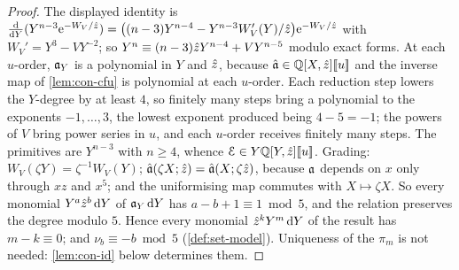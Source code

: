 \begin{proof}
The displayed identity is $\frac{\mathrm{d}}{\mathrm{d} Y}(Y^{n-3}\mathrm{e}^{-W_V/\hat{z}})=\bigl((n-3)Y^{n-4}-Y^{n-3}W_V'(Y)/\hat{z}\bigr)\mathrm{e}^{-W_V/\hat{z}}$ with $W_V'=Y^3-VY^{-2}$; so $Y^n\equiv(n-3)\hat{z} Y^{n-4}+VY^{n-5}$ modulo exact forms. At each $u$-order, $\mathfrak{a}_Y$ is a polynomial in $Y$ and $\hat{z}$, because $\hat{\mathfrak{a}}\in\mathbb{Q}[X,\hat{z}][\![ u ]\!]$ and the inverse map of \cref{lem:con-cfu} is polynomial at each $u$-order. Each reduction step lowers the $Y$-degree by at least $4$, so finitely many steps bring a polynomial to the exponents $-1,\dots,3$, the lowest exponent produced being $4-5=-1$; the powers of $V$ bring power series in $u$, and each $u$-order receives finitely many steps. The primitives are $Y^{n-3}$ with $n\geq4$, whence $\mathcal E\in Y\mathbb{Q}[Y,\hat{z}][\![ u ]\!]$. Grading: $W_V(\zeta Y)=\zeta^{-1}W_V(Y)$; $\hat{\mathfrak{a}}(\zeta X;\hat{z})=\hat{\mathfrak{a}}(X;\zeta\hat{z})$, because $\mathfrak{a}$ depends on $x$ only through $xz$ and $x^5$; and the uniformising map commutes with $X\mapsto\zeta X$. So every monomial $Y^a\hat{z}^b\,\mathrm{d} Y$ of $\mathfrak{a}_Y\,\mathrm{d} Y$ has $a-b+1\equiv1\bmod5$, and the relation preserves the degree modulo $5$. Hence every monomial $\hat{z}^kY^m\,\mathrm{d} Y$ of the result has $m-k\equiv0$; and $\nu_b\equiv-b\bmod5$ (\cref{def:set-model}). Uniqueness of the $\pi_m$ is not needed: \cref{lem:con-id} below determines them.
\end{proof}


